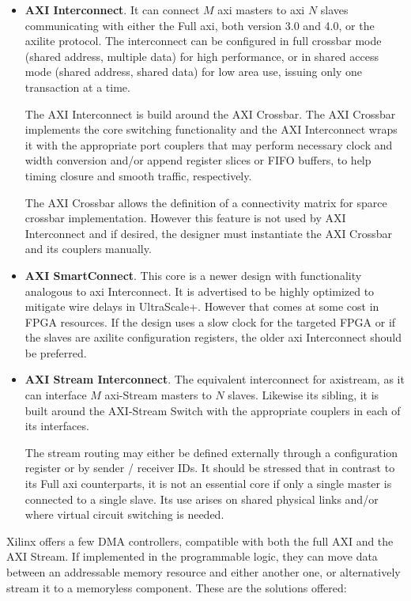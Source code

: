 \begin{itemize}
\item	\textbf{AXI Interconnect}.
	It can connect $M$ \gls{axi} masters to \gls{axi} $N$ slaves 
	communicating with either the Full \gls{axi},
	both version 3.0 and 4.0, or the \gls{axilite} protocol.
	The interconnect can be configured in full crossbar mode 
	(shared address, multiple data) for high performance,
	or in shared access mode (shared address, shared data) 
	for low area use, issuing only one transaction at a time.
	
	The AXI Interconnect is build around the AXI Crossbar. 
	The AXI Crossbar implements the core switching functionality 
	and the AXI Interconnect wraps it with the appropriate port couplers that may
	perform necessary clock and width conversion and/or append register slices or FIFO buffers,
	to help timing closure and smooth traffic, respectively.

	The AXI Crossbar allows the definition of a connectivity matrix 
	for sparce crossbar implementation. 
	However this feature is not used by AXI Interconnect and if desired,
	the designer must instantiate the AXI Crossbar and its couplers manually.

\item	\textbf{AXI SmartConnect}. 
	This core is a newer design with functionality analogous to \gls{axi} Interconnect.
	It is advertised to be highly optimized to mitigate wire delays in UltraScale+.
	However that comes at some cost in FPGA resources.
	If the design uses a slow clock for the targeted FPGA or 
	if the slaves are \gls{axilite} configuration registers,
	the older \gls{axi} Interconnect should be preferred.

\item	\textbf{AXI Stream Interconnect}. 
	The equivalent interconnect for \gls{axistream}, 
	as it can interface $M$ \gls{axi}-Stream masters to $N$ slaves.
	Likewise its sibling, it is built around the AXI-Stream Switch with the appropriate
	couplers in each of its interfaces.

	The stream routing may either be defined externally through 
	a configuration register or by sender / receiver IDs. 
	It should be stressed that in contrast to its Full \gls{axi} counterparts, 
	it is not an essential core if only a single master is connected to a single slave.
	Its use arises on shared physical links and/or where virtual circuit switching is needed.
\end{itemize}

Xilinx offers a few DMA controllers, compatible with both the full AXI and the AXI Stream.
If implemented in the programmable logic, they can move data between an
addressable memory resource and either another one, or alternatively stream it
to a memoryless component. These are the solutions offered:

